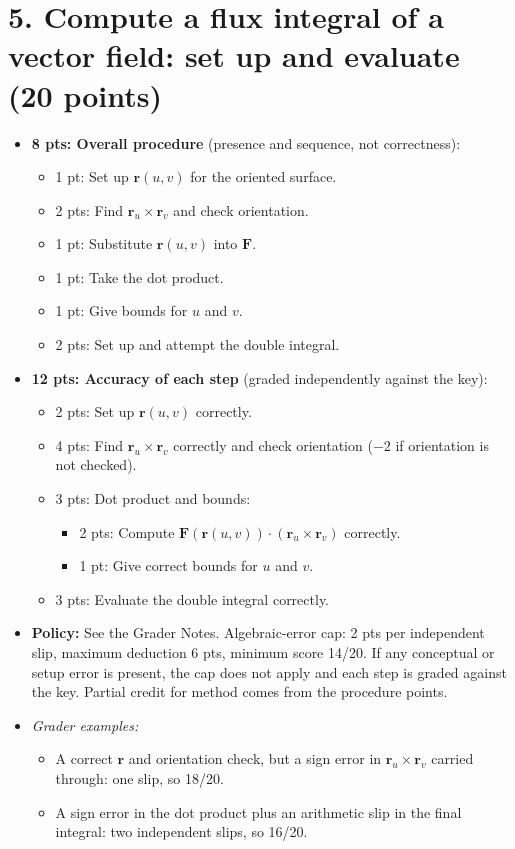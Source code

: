 \documentclass[11pt,letterpaper]{article}
\renewcommand{\vec}[1]{\mathbf{#1}}
\begin{document}
\section*{5. Compute a flux integral of a vector field: set up and evaluate (20 points)}
\begin{itemize}
  \item \textbf{8 pts: Overall procedure} (presence and sequence, not correctness):
  \begin{itemize}
    \item 1 pt: Set up $\vec r(u,v)$ for the oriented surface.
    \item 2 pts: Find $\vec r_u\times\vec r_v$ and check orientation.
    \item 1 pt: Substitute $\vec r(u,v)$ into $\vec F$.
    \item 1 pt: Take the dot product.
    \item 1 pt: Give bounds for $u$ and $v$.
    \item 2 pts: Set up and attempt the double integral.
  \end{itemize}
  \item \textbf{12 pts: Accuracy of each step} (graded independently against the key):
  \begin{itemize}
    \item 2 pts: Set up $\vec r(u,v)$ correctly.
    \item 4 pts: Find $\vec r_u\times\vec r_v$ correctly and check orientation ($-2$ if orientation is not checked).
    \item 3 pts: Dot product and bounds:
    \begin{itemize}
      \item 2 pts: Compute $\vec F(\vec r(u,v))\cdot(\vec r_u\times\vec r_v)$ correctly.
      \item 1 pt: Give correct bounds for $u$ and $v$.
    \end{itemize}
    \item 3 pts: Evaluate the double integral correctly.
  \end{itemize}
  \item \textbf{Policy:} See the Grader Notes. Algebraic-error cap: 2 pts per independent slip, maximum deduction 6 pts, minimum score 14/20. If any conceptual or setup error is present, the cap does not apply and each step is graded against the key. Partial credit for method comes from the procedure points.
  \item \textit{Grader examples:}
  \begin{itemize}
    \item A correct $\vec r$ and orientation check, but a sign error in $\vec r_u\times\vec r_v$ carried through: one slip, so 18/20.
    \item A sign error in the dot product plus an arithmetic slip in the final integral: two independent slips, so 16/20.
  \end{itemize}
\end{itemize}
 \newpage
\end{document}
